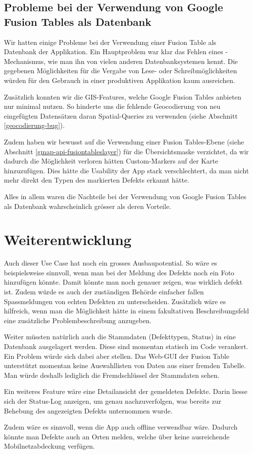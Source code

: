 \subsection{Probleme bei der Verwendung von Google Fusion Tables als Datenbank}
Wir hatten einige Probleme bei der Verwendung einer Fusion Table als Datenbank der Applikation. Ein Hauptproblem war klar das Fehlen eines -Mechanismus, wie man ihn von vielen anderen Datenbanksystemen kennt. Die gegebenen Möglichkeiten für die Vergabe von Lese- oder Schreibmöglichkeiten würden für den Gebrauch in einer produktiven Applikation kaum ausreichen.

Zusätzlich konnten wir die GIS-Features, welche Google Fusion Tables anbieten nur minimal nutzen. So hinderte uns die fehlende  Geocodierung von neu eingefügten Datensätzen daran Spatial-Queries zu verwenden (siehe Abschnitt \ref{geocodierung-bug}).

Zudem haben wir bewusst auf die Verwendung einer Fusion Tables-Ebene (siehe Abschnitt \ref{gmap-api-fusiontableslayer}) für die Übersichtsmaske verzichtet, da wir dadurch die Möglichkeit verloren hätten Custom-Markers auf der Karte hinzuzufügen. Dies hätte die Usability der App stark verschlechtert, da man nicht mehr direkt den Typen des markierten Defekts erkannt hätte.

Alles in allem waren die Nachteile bei der Verwendung von Google Fusion Tables als Datenbank wahrscheinlich grösser als deren Vorteile.

\section{Weiterentwicklung}
Auch dieser Use Case hat noch ein grosses Ausbaupotential. So wäre es beispielsweise sinnvoll, wenn man bei der Meldung des Defekts noch ein Foto hinzufügen könnte. Damit könnte man noch genauer zeigen, was wirklich defekt ist. Zudem würde es auch der zuständigen Behörde einfacher fallen Spassmeldungen von echten Defekten zu unterscheiden. Zusätzlich wäre es hilfreich, wenn man die Möglichkeit hätte in einem fakultativen Beschreibungsfeld eine zusätzliche Problembeschreibung anzugeben.

Weiter müssten natürlich auch die Stammdaten (Defekttypen, Status) in eine Datenbank ausgelagert werden. Diese sind momentan statisch im Code verankert. Ein Problem würde sich dabei aber stellen. Das Web-GUI der Fusion Table unterstützt momentan keine Auswahllisten von Daten aus einer fremden Tabelle. Man würde deshalb lediglich die Fremdschlüssel der Stammdaten sehen.

Ein weiteres Feature wäre eine Detailansicht der gemeldeten Defekte. Darin liesse sich der Status-Log anzeigen, um genau nachzuverfolgen, was bereits zur Behebung des angezeigten Defekts unternommen wurde. 

Zudem wäre es sinnvoll, wenn die App auch offline verwendbar wäre. Dadurch könnte man Defekte auch an Orten melden, welche über keine ausreichende Mobilnetzabdeckung verfügen.